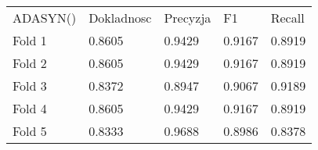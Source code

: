 \begin{tabular}{lllll}
\hline
 ADASYN() & Dokladnosc & Precyzja & F1     & Recall \\
 Fold 1   & 0.8605     & 0.9429   & 0.9167 & 0.8919 \\
 Fold 2   & 0.8605     & 0.9429   & 0.9167 & 0.8919 \\
 Fold 3   & 0.8372     & 0.8947   & 0.9067 & 0.9189 \\
 Fold 4   & 0.8605     & 0.9429   & 0.9167 & 0.8919 \\
 Fold 5   & 0.8333     & 0.9688   & 0.8986 & 0.8378 \\
\hline
\end{tabular}